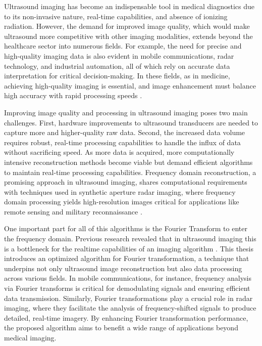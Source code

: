Ultrasound imaging has become an indispensable tool in medical diagnostics due to its non-invasive nature, real-time capabilities, and absence of ionizing radiation. However, the demand for improved image quality, which would make ultrasound more competitive with other imaging modalities, extends beyond the healthcare sector into numerous fields. For example, the need for precise and high-quality imaging data is also evident in mobile communications, radar technology, and industrial automation, all of which rely on accurate data interpretation for critical decision-making. In these fields, as in medicine, achieving high-quality imaging is essential, and image enhancement must balance high accuracy with rapid processing speeds \cite{szabo_diagnostic_2014, michalke_overview_2012}.\par
Improving image quality and processing in ultrasound imaging poses two main challenges. First, hardware improvements to ultrasound transducers are needed to capture more and higher-quality raw data. Second, the increased data volume requires robust, real-time processing capabilities to handle the influx of data without sacrificing speed. As more data is acquired, more computationally intensive reconstruction methods become viable but demand efficient algorithms to maintain real-time processing capabilities. Frequency domain reconstruction, a promising approach in ultrasound imaging, shares computational requirements with techniques used in synthetic aperture radar imaging, where frequency domain processing yields high-resolution images critical for applications like remote sensing and military reconnaissance \cite{dorausch_adoption_2023, alvarez_fourier-based_2014}.\par
One important part for all of this algorithms is the Fourier Transform to enter the frequency domain. Previous research revealed that in ultrasound imaging this is a bottleneck for the realtime capabilities of an imaging algorithm \cite{Richter_2024}. This thesis introduces an optimized algorithm for Fourier transformation, a technique that underpins not only ultrasound image reconstruction but also data processing across various fields. In mobile communications, for instance, frequency analysis via Fourier transforms is critical for demodulating signals and ensuring efficient data transmission. Similarly, Fourier transformations play a crucial role in radar imaging, where they facilitate the analysis of frequency-shifted signals to produce detailed, real-time imagery. By enhancing Fourier transformation performance, the proposed algorithm aims to benefit a wide range of applications beyond medical imaging. \cite{alvarez_fourier-based_2014, gupta_fourier_2013}\par
